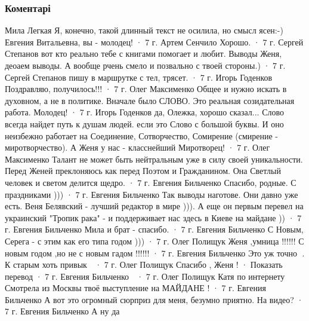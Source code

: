  
 
 
 
 
\subsubsection{Коментарі}

Мила Легкая
Я, конечно, такой длинный текст не осилила, но смысл ясен:-) Евгения Витальевна, вы - молодец!
 · 7 г.
Артем Сенчило
Хорошо.
 · 7 г.
Сергей Степанов
вот кто реально тебе с книгами помогает и любит. Выводы Женя, деоаем выводы. А вообще рчень смело и позвально с твоей стороны.)
 · 7 г.
Сергей Степанов
пишу в маршрутке с тел, трясет.
 · 7 г.
Игорь Годенков
Поздравляю, получилось!!!
 · 7 г.
Олег Максименко
Общее и нужно искать в духовном, а не в политике. Вначале было СЛОВО. Это реальная созидательная работа. Молодец!
 · 7 г.
Игорь Годенков
да, Олежка, хорошо сказал... Слово всегда найдет путь к душам людей. если это Слово с большой буквы. И оно неизбежно работает на Соединение, Сотворчество, Сомирение (смирение - миротворчество). А Женя у нас - класснейший Миротворец!
 · 7 г.
Олег Максименко
Талант не может быть нейтральным уже в силу своей уникальности. Перед Женей преклоняюсь как перед Поэтом и Гражданином. Она Светлый человек и светом делится щедро.
 · 7 г.
Евгения Бильченко
Спасибо, родные. С праздниками )))
 · 7 г.
Евгения Бильченко
Так выводы наготове. Они давно уже есть. Веня Белявский - лучший редактор в мире ))). А еще он первым перевел на украинский "Тропик рака" - и поддерживает нас здесь в Киеве на майдане ))
 · 7 г.
Евгения Бильченко
Мила и брат - спасибо.
 · 7 г.
Евгения Бильченко
С Новым, Серега - с этим как его типа годом )))
 · 7 г.
Олег Полищук
Женя ,умница !!!!!! С новым годом ,но не с новым гадом !!!!!!
 · 7 г.
Евгения Бильченко
Это уж точно 🙂. К старым хоть привык 🙂
 · 7 г.
Олег Полищук
Спасибо , Женя !
 · Показать перевод · 7 г.
Евгения Бильченко
🙂
 · 7 г.
Олег Полищук
Катя по интернету Смотрела из Москвы твоё выступление на МАЙДАНЕ !
 · 7 г.
Евгения Бильченко
А вот это огромный сюрприз для меня, безумно приятно. На видео?
 · 7 г.
Евгения Бильченко
А ну да 🙂

